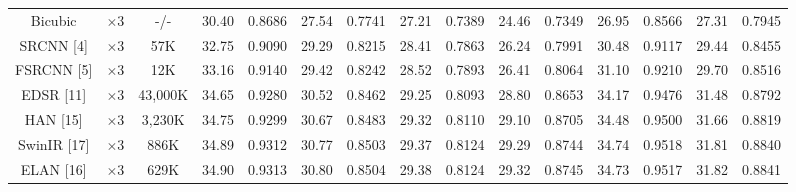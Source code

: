 \documentclass[journal]{IEEEtran}
\begin{document}
\begin{table}
\begin{tabular}{|c|c|c|cc|cc|cc|cc|cc|cc|}
Bicubic&$\times3$ &-/-& \multicolumn{1}{c|}{30.40} & 0.8686  & \multicolumn{1}{c|}{27.54} & 0.7741 & \multicolumn{1}{c|}{27.21} & 0.7389 & \multicolumn{1}{c|}{24.46} & 0.7349  & \multicolumn{1}{c|}{26.95} &0.8566
&\multicolumn{1}{c|}{27.31} & 0.7945\\

SRCNN [4] & $\times3$ & 57K&\multicolumn{1}{c|}{32.75} & 0.9090  & \multicolumn{1}{c|}{29.29} & 0.8215  &\multicolumn{1}{c|}{28.41} & 0.7863  & \multicolumn{1}{c|}{26.24} &0.7991 & \multicolumn{1}{c|}{30.48} &0.9117
&\multicolumn{1}{c|}{29.44} & 0.8455\\

FSRCNN [5]& $\times3$ &12K& \multicolumn{1}{c|}{33.16} &0.9140& \multicolumn{1}{c|}{29.42} & 0.8242 &\multicolumn{1}{c|}{28.52} & 0.7893& \multicolumn{1}{c|}{26.41} &0.8064& \multicolumn{1}{c|}{31.10} &0.9210
&\multicolumn{1}{c|}{29.70} & 0.8516\\

EDSR [11]& $\times3$&43,000K& \multicolumn{1}{c|}{34.65} & 0.9280 & \multicolumn{1}{c|}{30.52} & 0.8462 &\multicolumn{1}{c|}{29.25} & 0.8093& \multicolumn{1}{c|}{28.80} & 0.8653 & \multicolumn{1}{c|}{34.17} & 0.9476
&\multicolumn{1}{c|}{31.48} &0.8792\\

HAN [15] & $\times3$&3,230K& \multicolumn{1}{c|}{34.75} & 0.9299 & \multicolumn{1}{c|}{30.67} & 0.8483 &\multicolumn{1}{c|}{29.32} & 0.8110 & \multicolumn{1}{c|}{29.10} & 0.8705 & \multicolumn{1}{c|}{34.48} & 0.9500
&\multicolumn{1}{c|}{31.66} &0.8819\\


SwinIR [17] & $\times3$ &886K& \multicolumn{1}{c|}{34.89} & {0.9312} & \multicolumn{1}{c|}{30.77} &{0.8503} & \multicolumn{1}{c|}{29.37} & {0.8124} & {29.29} & {0.8744}& \multicolumn{1}{c|}{34.74} &{0.9518} &\multicolumn{1}{c|}{31.81} & {0.8840}\\

ELAN [16] & $\times 3$ &629K& \multicolumn{1}{c|}{34.90} & 0.9313 & \multicolumn{1}{c|}{30.80} & 0.8504 & \multicolumn{1}{c|}{29.38} & 0.8124 & \multicolumn{1}{c|}{29.32} &0.8745 & \multicolumn{1}{c|}{34.73} & 0.9517
&\multicolumn{1}{c|}{31.82} & 0.8841\\


\end{tabular}
\end{table}
\end{document}
